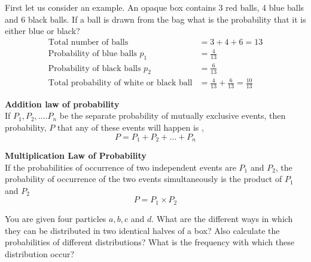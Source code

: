 First let us consider an example. An opaque box contains 3 red balls, 4 blue balls and 6 black balls. If a ball is drawn from the bag what is the probability that it is either blue or black?
\begin{align*}
\text{Total number of balls}&=3+4+6=13\\
\text{Probability of blue balls $p_1$}&=\frac{4}{13}\\
\text{Probability of black balls $p_2$}&=\frac{6}{13}\\
\text{Total probability of white or black ball}&=\frac{4}{13}+\frac{6}{13}=\frac{10}{13}
\end{align*}
\begin{theorem}\textbf{Addition law of probability}\\
	If $P_{1}, P_{2}, \ldots . P_{n}$ be the separate probability of mutually exclusive events, then probability, $P$ that any of these events will happen is , $$P=P_{1}+P_{2}+\ldots+P_{n}$$
\end{theorem}
\begin{theorem}\textbf{Multiplication Law of Probability}\\
If the probabilities of occurrence of two independent events are $P_{1}$ and $P_{2}$, the probability of occurrence of the two events simultaneously is the product of $P_{1}$ and $P_{2}$
$$ P=P_{1} \times P_{2}$$
\end{theorem}
\begin{exercise}
	You are given four particles $a, b, c$ and $d$. What are the different ways in which they can be distributed in two identical halves of a box? Also calculate the probabilities of different distributions? What is the frequency with which these distribution occur?
\end{exercise}
